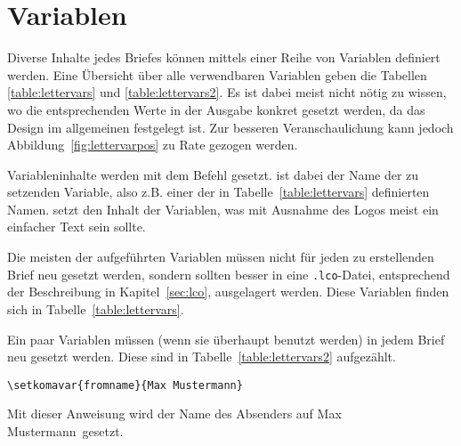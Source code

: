 \section{Variablen}\label{sec:lettervars}

Diverse Inhalte jedes Briefes können mittels einer Reihe von Variablen
definiert werden.
Eine Übersicht über alle verwendbaren Variablen geben die
Tabellen \ref{table:lettervars} und \ref{table:lettervars2}.
Es ist dabei meist nicht nötig zu wissen,
wo die entsprechenden Werte in der Ausgabe konkret gesetzt werden,
da das Design im allgemeinen festgelegt ist.
Zur besseren Veranschaulichung kann jedoch
Abbildung~\ref{fig:lettervarpos} zu Rate gezogen werden.

\begin{Declaration}
\end{Declaration}

Variableninhalte werden mit dem Befehl  gesetzt.
 ist dabei der Name der zu setzenden Variable, also z.B. einer der in
Tabelle~\ref{table:lettervars} definierten Namen.  setzt den
Inhalt der Variablen, was mit Ausnahme des Logos meist ein einfacher
Text sein sollte.

Die meisten der aufgeführten Variablen müssen nicht für jeden zu erstellenden
Brief neu gesetzt werden, sondern sollten besser in eine \texttt{.lco}-Datei,
entsprechend der Beschreibung in Kapitel~\ref{sec:lco}, ausgelagert werden.
Diese Variablen finden sich in Tabelle~\ref{table:lettervars}.

Ein paar Variablen müssen (wenn sie überhaupt benutzt werden) in jedem Brief
neu gesetzt werden. Diese sind in Tabelle~\ref{table:lettervars2} aufgezählt.

\begin{example}
\begin{lstlisting}
\setkomavar{fromname}{Max Mustermann}
\end{lstlisting}
Mit dieser Anweisung wird der Name des Absenders auf \glqq Max Mustermann\grqq\ 
gesetzt.
\end{example}


